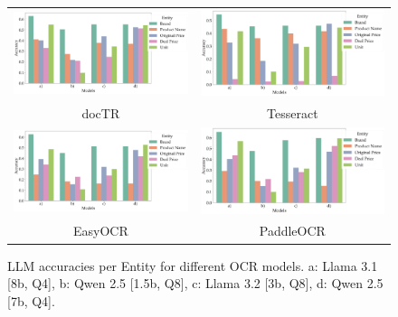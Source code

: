 \documentclass[11pt]{article}
\begin{document}
\begin{figure}[h!]
    \begin{tabular}{cc}
      \includegraphics[width=0.5\linewidth]{figures/doctr_ocr_accuracies.png} &   \includegraphics[width=0.5\linewidth]{figures/tesseract_ocr_accuracies.png} \\
    docTR & Tesseract \\[6pt]
        \includegraphics[width=0.5\linewidth]{figures/easyocr_ocr_accuracies.png} &   \includegraphics[width=0.5\linewidth]{figures/ppocr_ocr_accuracies.png} \\
    EasyOCR & PaddleOCR \\[6pt]
    \end{tabular}
    \caption{LLM accuracies per Entity for different OCR models. a: Llama 3.1 [8b, Q4], b: Qwen 2.5 [1.5b, Q8], c: Llama 3.2 [3b, Q8], d: Qwen 2.5 [7b, Q4].}
    \label{fig:eval_ocr_llm_accuracies}
\end{figure}
\end{document}
